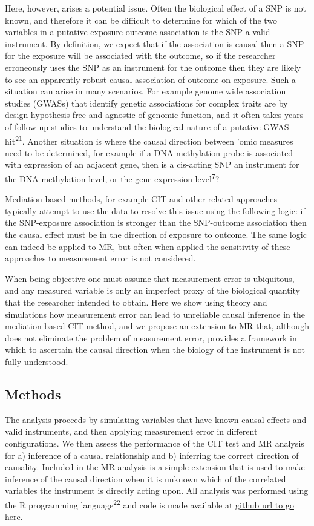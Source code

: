 \documentclass[]{article}
\begin{document}
Here, however, arises a potential issue. Often the biological effect of
a SNP is not known, and therefore it can be difficult to determine for
which of the two variables in a putative exposure-outcome association is
the SNP a valid instrument. By definition, we expect that if the
association is causal then a SNP for the exposure will be associated
with the outcome, so if the researcher erroneously uses the SNP as an
instrument for the outcome then they are likely to see an apparently
robust causal association of outcome on exposure. Such a situation can
arise in many scenarios. For example genome wide association studies
(GWASs) that identify genetic associations for complex traits are by
design hypothesis free and agnostic of genomic function, and it often
takes years of follow up studies to understand the biological nature of
a putative GWAS hit\textsuperscript{21}. Another situation is where the
causal direction between 'omic measures need to be determined, for
example if a DNA methylation probe is associated with expression of an
adjacent gene, then is a cis-acting SNP an instrument for the DNA
methylation level, or the gene expression level\textsuperscript{7}?

Mediation based methods, for example CIT and other related approaches
typically attempt to use the data to resolve this issue using the
following logic: if the SNP-exposure association is stronger than the
SNP-outcome association then the causal effect must be in the direction
of exposure to outcome. The same logic can indeed be applied to MR, but
often when applied the sensitivity of these approaches to measurement
error is not considered.

When being objective one must assume that measurement error is
ubiquitous, and any measured variable is only an imperfect proxy of the
biological quantity that the researcher intended to obtain. Here we show
using theory and simulations how measurement error can lead to
unreliable causal inference in the mediation-based CIT method, and we
propose an extension to MR that, although does not eliminate the problem
of measurement error, provides a framework in which to ascertain the
causal direction when the biology of the instrument is not fully
understood.

\subsection{Methods}\label{methods}

The analysis proceeds by simulating variables that have known causal
effects and valid instruments, and then applying measurement error in
different configurations. We then assess the performance of the CIT test
and MR analysis for a) inference of a causal relationship and b)
inferring the correct direction of causality. Included in the MR
analysis is a simple extension that is used to make inference of the
causal direction when it is unknown which of the correlated variables
the instrument is directly acting upon. All analysis was performed using
the R programming language\textsuperscript{22} and code is made
available at \href{}{github url to go here}.
\end{document}
